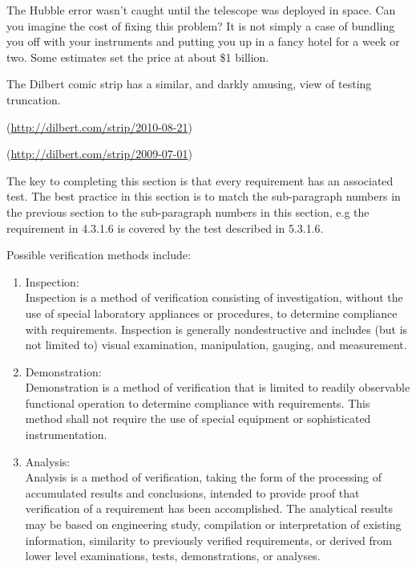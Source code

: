 \begin{slshape}
The Hubble error wasn't caught until the telescope was deployed in space.  Can you imagine the cost of fixing this problem?  It is not simply a case of bundling you off with your instruments and putting you up in a fancy hotel for a week or two.  Some estimates set the price at about \$1 billion.
\bigskip

The Dilbert comic strip has a similar, and darkly amusing, view of testing truncation.
\bigskip  

(\url{http://dilbert.com/strip/2010-08-21})
\bigskip

(\url{http://dilbert.com/strip/2009-07-01})
\bigskip



	
The key to completing this section is that every requirement has an associated test.  The best practice in this section is to match the sub-paragraph numbers in the previous section to the sub-paragraph numbers in this section, e.g the requirement in 4.3.1.6 is covered by the test described in 5.3.1.6.
\bigskip

	Possible verification methods include:
	\bigskip
	
	\begin{enumerate}
		\item Inspection:\\

	Inspection is a method of verification consisting of investigation, 
	without the use of special laboratory appliances or procedures, to 
	determine compliance with requirements. Inspection is generally 
	nondestructive and includes (but is not limited to) visual examination, 
	manipulation, gauging, and measurement.

		\item Demonstration:\\

	Demonstration is a method of verification that is limited to readily 
	observable functional operation to determine compliance with 
	requirements. This method shall not require the use of special equipment 
	or sophisticated instrumentation.
	
		\item Analysis:\\

	Analysis is a method of verification, taking the form of the processing of 
	accumulated results and conclusions, intended to provide proof that 
	verification of a requirement has been accomplished. The analytical 
	results may be based on engineering study, compilation or interpretation 
	of existing information, similarity to previously verified requirements, 
	or derived from lower level examinations, tests, demonstrations, or 
	analyses.



\end{enumerate}
\end{slshape}
